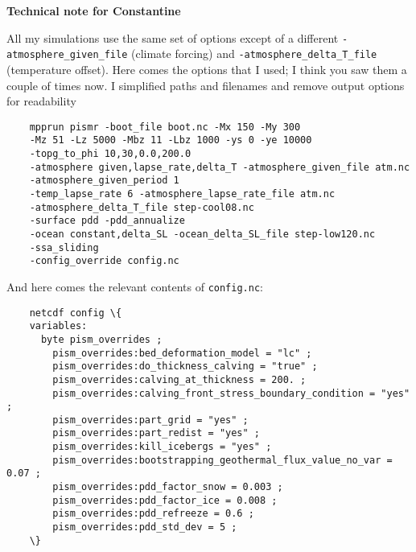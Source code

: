 \begin{figure*}\begin{framed}
	\textbf{Technical note for Constantine}

	All my simulations use the same set of options except of a different \verb|-atmosphere_given_file| (climate forcing) and \verb|-atmosphere_delta_T_file| (temperature offset). Here comes the options that I used; I think you saw them a couple of times now. I simplified paths and filenames and remove output options for readability

	\begin{verbatim}
	mpprun pismr -boot_file boot.nc -Mx 150 -My 300
	-Mz 51 -Lz 5000 -Mbz 11 -Lbz 1000 -ys 0 -ye 10000
	-topg_to_phi 10,30,0.0,200.0
	-atmosphere given,lapse_rate,delta_T -atmosphere_given_file atm.nc
	-atmosphere_given_period 1
	-temp_lapse_rate 6 -atmosphere_lapse_rate_file atm.nc
	-atmosphere_delta_T_file step-cool08.nc
	-surface pdd -pdd_annualize
	-ocean constant,delta_SL -ocean_delta_SL_file step-low120.nc
	-ssa_sliding
	-config_override config.nc
	\end{verbatim}

	And here comes the relevant contents of \verb|config.nc|:

	\begin{verbatim}
	netcdf config \{
	variables:
	  byte pism_overrides ;
	    pism_overrides:bed_deformation_model = "lc" ;
	    pism_overrides:do_thickness_calving = "true" ;
	    pism_overrides:calving_at_thickness = 200. ;
	    pism_overrides:calving_front_stress_boundary_condition = "yes" ;
	    pism_overrides:part_grid = "yes" ;
	    pism_overrides:part_redist = "yes" ;
	    pism_overrides:kill_icebergs = "yes" ;
	    pism_overrides:bootstrapping_geothermal_flux_value_no_var = 0.07 ;
	    pism_overrides:pdd_factor_snow = 0.003 ;
	    pism_overrides:pdd_factor_ice = 0.008 ;
	    pism_overrides:pdd_refreeze = 0.6 ;
	    pism_overrides:pdd_std_dev = 5 ;
	\}
 
	\end{verbatim}

\end{framed}\end{figure*}


